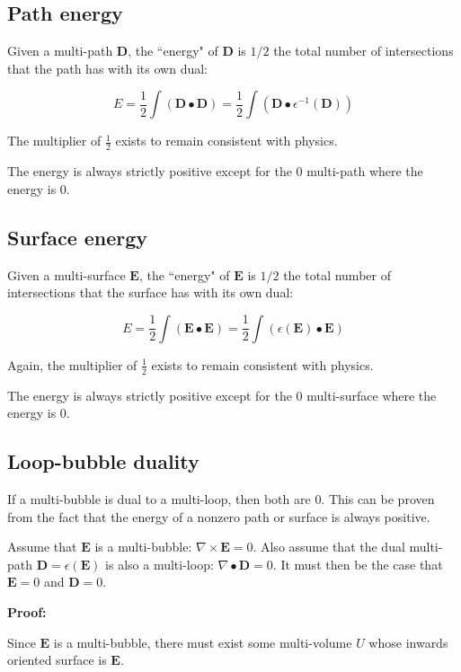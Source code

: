 \subsection{Path energy}

Given a multi-path \(\mathbf{D}\), the ``energy" of \(\mathbf{D}\) is \(1/2\) the total number of intersections that the path has with its own dual:

\[E = \frac{1}{2}\int (\mathbf{D} \bullet \mathbf{D}) = \frac{1}{2}\int (\mathbf{D} \bullet \epsilon^{-1}(\mathbf{D}))\]

The multiplier of \(\frac{1}{2}\) exists to remain consistent with physics.

The energy is always strictly positive except for the \(0\) multi-path where the energy is \(0\).


\subsection{Surface energy}

Given a multi-surface \(\mathbf{E}\), the ``energy" of \(\mathbf{E}\) is \(1/2\) the total number of intersections that the surface has with its own dual:

\[E = \frac{1}{2}\int (\mathbf{E} \bullet \mathbf{E}) = \frac{1}{2}\int (\epsilon(\mathbf{E}) \bullet \mathbf{E})\]

Again, the multiplier of \(\frac{1}{2}\) exists to remain consistent with physics.

The energy is always strictly positive except for the \(0\) multi-surface where the energy is \(0\).


\subsection{Loop-bubble duality}


If a multi-bubble is dual to a multi-loop, then both are \(0\). This can be proven from  the fact that the energy of a nonzero path or surface is always positive. 

\begin{thm}\label{thm:loop_bubble_duality}
Assume that \(\mathbf{E}\) is a multi-bubble: \(\nabla \times \mathbf{E} = 0\). Also assume that the dual multi-path \(\mathbf{D} = \epsilon(\mathbf{E})\) is also a multi-loop: \(\nabla \bullet \mathbf{D} = 0\). It must then be the case that \(\mathbf{E} = 0\) and \(\mathbf{D} = 0\).
\end{thm}
\textbf{Proof:}

Since \(\mathbf{E}\) is a multi-bubble, there must exist some multi-volume \(U\) whose inwards oriented surface is \(\mathbf{E}\). 

